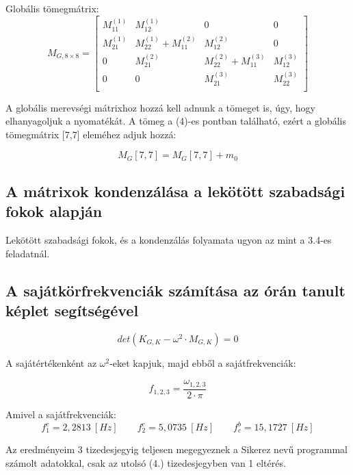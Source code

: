 \documentclass{article}
\newcommand{\rpm}{\raisebox{.2ex}{$\scriptstyle\pm$}}
\begin{document}
			Globális tömegmátrix: 
			\begin{equation}
				M_{G,8\times8}=
					\begin{bmatrix}
					M_{11}^{(1)} & M_{12}^{(1)}              & 0            			    & 0            \\
					M_{21}^{(1)} & M_{22}^{(1)}+M_{11}^{(2)} & M_{12}^{(2)}  			    & 0            \\
					0            & M_{21}^{(2)}              & M_{22}^{(2)} + M_{11}^{(3)}  & M_{12}^{(3)} \\
					0            & 0						 & M_{21}^{(3)} 				& M_{22}^{(3)} \\
					\end{bmatrix}
			\end{equation}
			
			A globális merevségi mátrixhoz hozzá kell adnunk a tömeget is, úgy, hogy elhanyagoljuk a nyomatékát. A tömeg a (4)-es pontban található, ezért a globális tömegmátrix [7,7] eleméhez adjuk hozzá:
			
			\begin{equation}
				M_G[7,7] = M_G[7,7] + m_0
			\end{equation}
		
		
		\subsection{A mátrixok kondenzálása a lekötött szabadsági fokok alapján}
		
			Lekötött szabadsági fokok, és a kondenzálás folyamata ugyon az mint a 3.4-es feladatnál.
		
		\subsection{A sajátkörfrekvenciák számítása az órán tanult képlet segítségével}
	
			\begin{equation}
				det(K_{G,K} - \omega^2 \cdot M_{G,K}) = 0
			\end{equation}
			
			A sajátértékenként az $\omega^2$-eket kapjuk, majd ebből a sajátfrekvenciák:
			
			\begin{equation}
				f_{1,2,3}=\frac{\omega_{1,2,3}}{2\cdot \pi}
			\end{equation}
			
			Amivel a sajátfrekvenciák:	
			\[f_1^c=2,2813~[Hz] \qquad f_2^c=5,0735~[Hz] \qquad f_c^b=15,1727~[Hz]  \]
			
			Az eredményeim 3 tizedesjegyig teljesen megegyeznek a Sikerez nevű programmal számolt adatokkal, csak az utolsó (4.) tizedesjegyben van \rpm1 eltérés.
\end{document}

